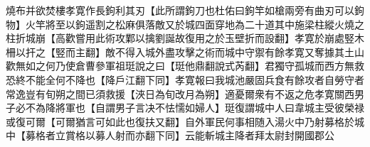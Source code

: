 燒布并欲焚樓孝寛作長鉤利其刃【此所謂鉤刀也杜佑曰鉤竿如槍兩旁有曲刃可以鉤物】火竿將至以鉤遥割之松麻俱落敵又於城四面穿地為二十道其中施梁柱縱火燒之柱折城崩【高歡嘗用此術攻鄴以擒劉誕故復用之於玉壁折而設翻】孝寛於崩處竪木柵以扞之【竪而主翻】敵不得入城外盡攻擊之術而城中守禦有餘孝寛又奪據其土山歡無如之何乃使倉曹參軍祖珽說之曰【珽他鼎翻說式芮翻】君獨守孤城而西方無救恐終不能全何不降也【降戶江翻下同】孝寛報曰我城池嚴固兵食有餘攻者自勞守者常逸豈有旬朔之間已須救援【浹日為旬改月為朔】適憂爾衆有不返之危孝寛關西男子必不為降將軍也【自謂男子言决不怯懦如婦人】珽復謂城中人曰韋城主受彼榮禄或復可爾【可爾猶言可如此也復扶又翻】自外軍民何事相随入湯火中乃射募格於城中【募格者立賞格以募人射而亦翻下同】云能斬城主降者拜太尉封開國郡公